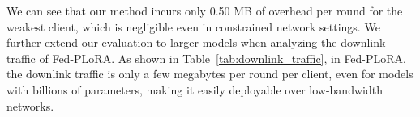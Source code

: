\documentclass{article} %
\begin{document}
\begin{table}[h]

\centering
\renewcommand{\arraystretch}{1.35}
\vspace{-4pt}
\caption{{Communication overhead of Fed-PLoRA compared with SOTA methods.}}
\label{tab:comm_overhead}
\end{table}

{We can see that our method incurs only 0.50 MB of overhead per round for the weakest client, which is negligible even in constrained network settings.
We further extend our evaluation to larger models when analyzing the downlink traffic of Fed-PLoRA. As shown in Table~\ref{tab:downlink_traffic}, in Fed-PLoRA, the downlink traffic is only a few megabytes per round per client, even for models with billions of parameters, making it easily deployable over low-bandwidth networks.}

\begin{table}[h]

\centering
\renewcommand{\arraystretch}{1.15}
\caption{{Downlink traffic of Fed–PLoRA across model scales.}}
\label{tab:downlink_traffic}
\end{table}
\end{document}
